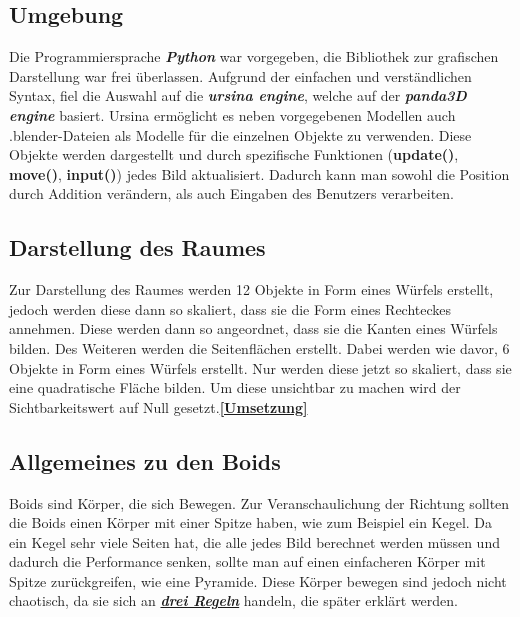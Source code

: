 \documentclass[a4paper, hidelinks, 12pt]{article}
\begin{document}
\subsection{Umgebung}
Die Programmiersprache \emph{\textbf{Python}} war vorgegeben, die Bibliothek zur grafischen Darstellung war frei überlassen. Aufgrund der einfachen und verständlichen Syntax, fiel die Auswahl auf die \emph{\textbf{ursina engine}}\cite{2022k}, welche auf der \emph{\textbf{panda3D engine}} basiert. Ursina ermöglicht es neben vorgegebenen Modellen auch .blender-Dateien als Modelle für die einzelnen Objekte zu verwenden. Diese Objekte werden dargestellt und durch spezifische Funktionen (\textbf{update()}, \textbf{move()}, \textbf{input()}) jedes Bild aktualisiert\cite{2022}. Dadurch kann man sowohl die Position durch Addition verändern, als auch Eingaben des Benutzers verarbeiten. 
	
\subsection{Darstellung des Raumes}
Zur Darstellung des Raumes werden 12 Objekte in Form eines Würfels erstellt, jedoch werden diese dann so skaliert, dass sie die Form eines Rechteckes annehmen. Diese werden dann so angeordnet, dass sie die Kanten eines Würfels bilden. 
Des Weiteren werden die Seitenflächen erstellt. Dabei werden wie davor, 6 Objekte in Form eines Würfels erstellt. Nur werden diese jetzt so skaliert, dass sie eine quadratische Fläche bilden. Um diese unsichtbar zu machen wird der Sichtbarkeitswert auf Null gesetzt.\cite{2022l}\hyperref[UmsetzungWireframe]{\textbf{[Umsetzung]}}
		
\subsection{Allgemeines zu den Boids}
Boids sind Körper, die sich Bewegen. Zur Veranschaulichung der Richtung sollten die Boids einen Körper mit einer Spitze haben, wie zum Beispiel ein Kegel. Da ein Kegel sehr viele Seiten hat, die alle jedes Bild berechnet werden müssen und dadurch die Performance senken, sollte man auf einen einfacheren Körper mit Spitze zurückgreifen, wie eine Pyramide. Diese Körper bewegen sind jedoch nicht chaotisch, da sie sich an \hyperref[IdeeRegel]{\textbf{\emph{drei Regeln}}} handeln, die später erklärt werden.\linebreak
\newpage
\end{document}
